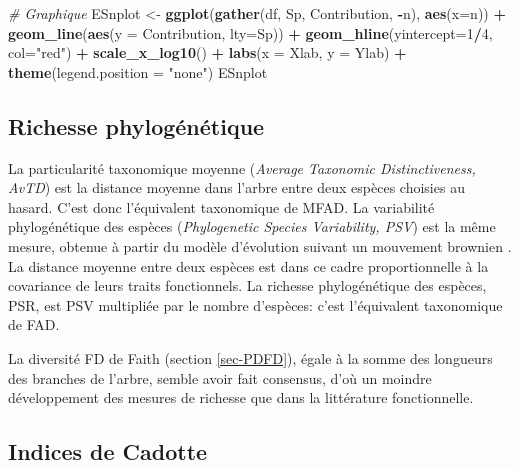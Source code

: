 \documentclass[
  11pt,
  french,
  a4paper,
  extrafontsizes,onecolumn,openright
  ]{memoir}
\newenvironment{Shaded}{\begin{snugshade}}{\end{snugshade}}
\newcommand{\AttributeTok}[1]{\textcolor[rgb]{0.13,0.29,0.53}{#1}}
\newcommand{\CommentTok}[1]{\textcolor[rgb]{0.56,0.35,0.01}{\textit{#1}}}
\newcommand{\DecValTok}[1]{\textcolor[rgb]{0.00,0.00,0.81}{#1}}
\newcommand{\FunctionTok}[1]{\textcolor[rgb]{0.13,0.29,0.53}{\textbf{#1}}}
\newcommand{\NormalTok}[1]{#1}
\newcommand{\OtherTok}[1]{\textcolor[rgb]{0.56,0.35,0.01}{#1}}
\newcommand{\SpecialCharTok}[1]{\textcolor[rgb]{0.81,0.36,0.00}{\textbf{#1}}}
\newcommand{\StringTok}[1]{\textcolor[rgb]{0.31,0.60,0.02}{#1}}
\begin{document}
\begin{Shaded}
\begin{Highlighting}[]
\CommentTok{\# Graphique}
\NormalTok{ESnplot }\OtherTok{\textless{}{-}} \FunctionTok{ggplot}\NormalTok{(}\FunctionTok{gather}\NormalTok{(df, Sp, Contribution, }\SpecialCharTok{{-}}\NormalTok{n), }\FunctionTok{aes}\NormalTok{(}\AttributeTok{x=}\NormalTok{n)) }\SpecialCharTok{+}
  \FunctionTok{geom\_line}\NormalTok{(}\FunctionTok{aes}\NormalTok{(}\AttributeTok{y =}\NormalTok{ Contribution, }\AttributeTok{lty=}\NormalTok{Sp)) }\SpecialCharTok{+}
  \FunctionTok{geom\_hline}\NormalTok{(}\AttributeTok{yintercept=}\DecValTok{1}\SpecialCharTok{/}\DecValTok{4}\NormalTok{, }\AttributeTok{col=}\StringTok{"red"}\NormalTok{) }\SpecialCharTok{+}
  \FunctionTok{scale\_x\_log10}\NormalTok{() }\SpecialCharTok{+}
  \FunctionTok{labs}\NormalTok{(}\AttributeTok{x =}\NormalTok{ Xlab, }\AttributeTok{y =}\NormalTok{ Ylab) }\SpecialCharTok{+}
  \FunctionTok{theme}\NormalTok{(}\AttributeTok{legend.position =} \StringTok{"none"}\NormalTok{)}
\NormalTok{ESnplot}
\end{Highlighting}
\end{Shaded}

\normalsize

\subsection{Richesse phylogénétique}\label{richesse-phyloguxe9nuxe9tique}

La particularité taxonomique moyenne \autocite{Warwick1995} (\emph{Average Taxonomic Distinctiveness, AvTD}) est la distance moyenne dans l'arbre entre deux espèces choisies au hasard.
C'est donc l'équivalent taxonomique de MFAD.
La variabilité phylogénétique des espèces \autocite{Helmus2007} (\emph{Phylogenetic Species Variability, PSV}) est la même mesure, obtenue à partir du modèle d'évolution suivant un mouvement brownien \autocite{Felsenstein1985}.
La distance moyenne entre deux espèces est dans ce cadre proportionnelle à la covariance de leurs traits fonctionnels.
La richesse phylogénétique des espèces, PSR, est PSV multipliée par le nombre d'espèces: c'est l'équivalent taxonomique de FAD.

La diversité FD de Faith (section \ref{sec-PDFD}), égale à la somme des longueurs des branches de l'arbre, semble avoir fait consensus, d'où un moindre développement des mesures de richesse que dans la littérature fonctionnelle.

\subsection{Indices de Cadotte}\label{indices-de-cadotte}
\end{document}

